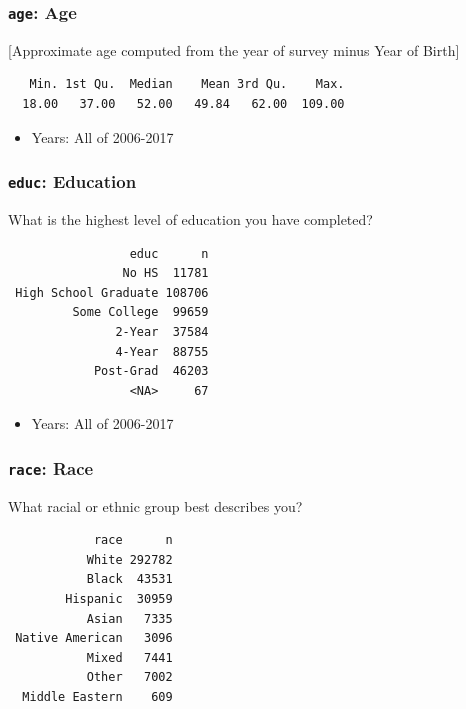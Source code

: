 \documentclass[10pt,article,oneside]{memoir}
\theoremstyle{definition}
\begin{document}
\hypertarget{age-age}{%
\subsubsection{\texorpdfstring{\texttt{age}:
Age}{age: Age}}\label{age-age}}

{[}Approximate age computed from the year of survey minus Year of
Birth{]}

\begin{verbatim}
   Min. 1st Qu.  Median    Mean 3rd Qu.    Max. 
  18.00   37.00   52.00   49.84   62.00  109.00 
\end{verbatim}

\begin{itemize}
\tightlist
\item
  Years: All of 2006-2017
\end{itemize}

\hypertarget{educ-education}{%
\subsubsection{\texorpdfstring{\texttt{educ}:
Education}{educ: Education}}\label{educ-education}}

What is the highest level of education you have completed?

\begin{verbatim}
                 educ      n
                No HS  11781
 High School Graduate 108706
         Some College  99659
               2-Year  37584
               4-Year  88755
            Post-Grad  46203
                 <NA>     67
\end{verbatim}

\begin{itemize}
\tightlist
\item
  Years: All of 2006-2017
\end{itemize}

\hypertarget{race-race}{%
\subsubsection{\texorpdfstring{\texttt{race}:
Race}{race: Race}}\label{race-race}}

What racial or ethnic group best describes you?

\begin{verbatim}
            race      n
           White 292782
           Black  43531
        Hispanic  30959
           Asian   7335
 Native American   3096
           Mixed   7441
           Other   7002
  Middle Eastern    609
\end{verbatim}
\end{document}
